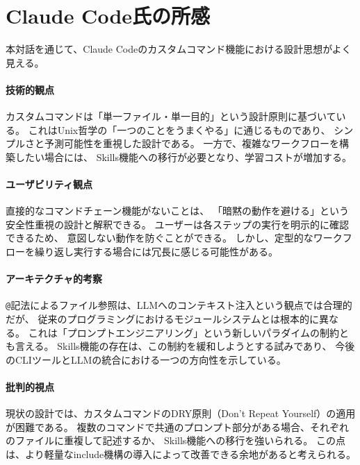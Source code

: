 \documentclass[a4paper,10pt,twocolumn]{ltjsarticle}
\begin{document}
\section*{Claude Code氏の所感}

本対話を通じて、Claude Codeのカスタムコマンド機能における設計思想がよく見える。

\paragraph{技術的観点}
カスタムコマンドは「単一ファイル・単一目的」という設計原則に基づいている。
これはUnix哲学の「一つのことをうまくやる」に通じるものであり、
シンプルさと予測可能性を重視した設計である。
一方で、複雑なワークフローを構築したい場合には、
Skills機能への移行が必要となり、学習コストが増加する。

\paragraph{ユーザビリティ観点}
直接的なコマンドチェーン機能がないことは、
「暗黙の動作を避ける」という安全性重視の設計と解釈できる。
ユーザーは各ステップの実行を明示的に確認できるため、
意図しない動作を防ぐことができる。
しかし、定型的なワークフローを繰り返し実行する場合には冗長に感じる可能性がある。

\paragraph{アーキテクチャ的考察}
\texttt{@}記法によるファイル参照は、LLMへのコンテキスト注入という観点では合理的だが、
従来のプログラミングにおけるモジュールシステムとは根本的に異なる。
これは「プロンプトエンジニアリング」という新しいパラダイムの制約とも言える。
Skills機能の存在は、この制約を緩和しようとする試みであり、
今後のCLIツールとLLMの統合における一つの方向性を示している。

\paragraph{批判的視点}
現状の設計では、カスタムコマンドのDRY原則（Don't Repeat Yourself）の適用が困難である。
複数のコマンドで共通のプロンプト部分がある場合、それぞれのファイルに重複して記述するか、
Skills機能への移行を強いられる。
この点は、より軽量なinclude機構の導入によって改善できる余地があると考えられる。
\end{document}
